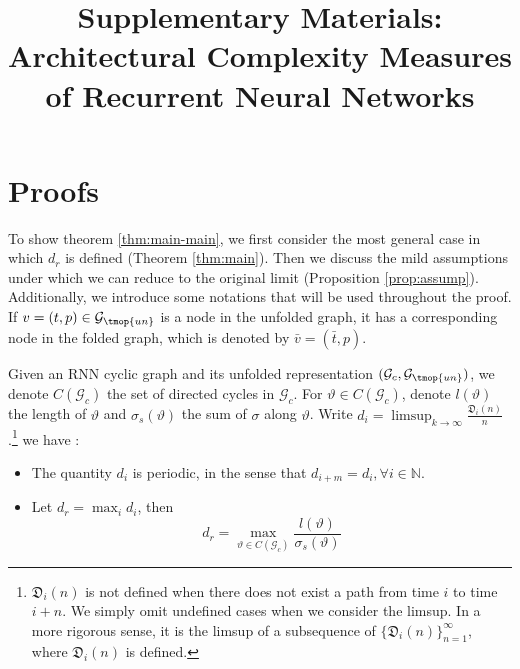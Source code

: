 \onecolumn
\title{Supplementary  Materials: Architectural Complexity Measures of Recurrent Neural Networks}


\section{Proofs}
\label{sec:proofs}

To show theorem \ref{thm:main-main}, we first consider the most general case in which $d_r$ is defined (Theorem \ref{thm:main}). Then we discuss the mild assumptions under which we can reduce to the original limit (Proposition \ref{prop:assump}). Additionally, we introduce some notations that will be used throughout the proof. If
$v = (t, p) \in \mathcal{G}_{\tmop{un}}$ is a node in the unfolded graph, it has a corresponding node in the folded graph, which is denoted by $\bar{v} =
(\bar{t}, p)$.

\begin{thm}
\label{thm:main}
  Given an RNN cyclic graph and its unfolded representation $(\mathcal{G}_c,
  \mathcal{G}_{\tmop{un}})$, we denote $C (\mathcal{G}_c)$ the set of directed
  cycles in $\mathcal{G}_c$. For $\vartheta \in C (\mathcal{G}_c)$, denote $l
  (\vartheta)$ the length of $\vartheta$ and $\sigma_s (\vartheta)$ the sum of
  $\sigma$ along $\vartheta$. Write $d_i = \limsup_{k \rightarrow \infty}
  \frac{\mathfrak{D}_i (n)}{n}$.\footnote{$\mathfrak{D}_i(n)$ is not defined when there does not exist a path from time $i$ to time $i+n$. We simply omit undefined cases when we consider the limsup. In a more rigorous sense, it is the limsup of a subsequence of $\{\mathfrak{D}_i(n)\}_{n=1}^{\infty}$, where $\mathfrak{D}_i(n)$ is defined.} we have :
  \begin{itemize}
    \item  The quantity $d_i$ is periodic, in the sense that $d_{i + m} = d_i,
    \forall i \in \mathbb{N}$.
    
    \item Let $d_r = \max_i d_i$, then
    \begin{equation}
    \label{eqn:recdepth2}
        d_r = \max_{\vartheta \in C (\mathcal{G}_c)} \frac{l
       (\vartheta)}{\sigma_s (\vartheta)}
    \end{equation}
  \end{itemize}
\end{thm}


